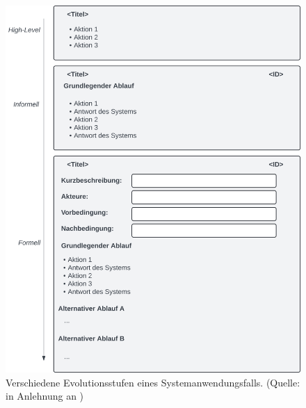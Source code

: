 \begin{tcolorbox}[title={Traditioneller Anwendungsfall (Systemanwendungsfall)}]
\begin{figure}
    \centering
    \includegraphics[scale=0.4]{chapters/Anhang/CheatSheets/img/systemusecase}
    \caption{Verschiedene Evolutionsstufen eines Systemanwendungsfalls. (Quelle: in Anlehnung an \cite[Abb. 4.6, 4.7, 4.8]{Wed09})}
    \label{fig:systemusecase-cc}
\end{figure}
\end{tcolorbox}
